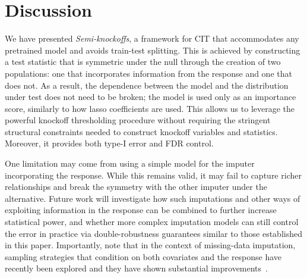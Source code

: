 \documentclass{article}
\theoremstyle{plain}
\theoremstyle{definition}
\theoremstyle{remark}
\begin{document}


\section{Discussion}

We have presented \textit{Semi-knockoffs}, a framework for CIT that accommodates any pretrained model and avoids train-test splitting. This is achieved by constructing a test statistic that is symmetric under the null through the creation of two populations: one that incorporates information from the response and one that does not. As a result, the dependence between the model and the distribution under test does not need to be broken; the model is used only as an importance score, similarly to how lasso coefficients are used. This allows us to leverage the  powerful knockoff thresholding procedure without requiring the stringent structural constraints needed to construct knockoff variables and statistics. Moreover, it provides both type-I error and FDR control.

One limitation may come from using a simple model for the imputer incorporating the response. While this remains valid, it may fail to capture richer relationships and break the symmetry with the other imputer under the alternative. Future work will investigate how such imputations and other ways of exploiting information in the response can be combined to further increase statistical power, and whether more complex imputation models can still control the error in practice via double-robustness guarantees similar to those established in this paper. Importantly, note that in the context of missing-data imputation, sampling strategies that condition on both covariates and the response have recently been explored and they have shown substantial improvements~\cite{DAgostinoMcGowan2024}. 
\end{document}

